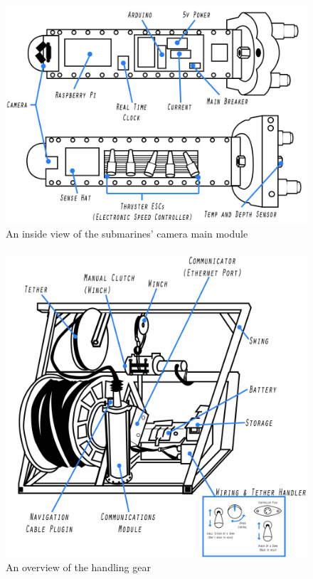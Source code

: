 \documentclass[
18pt, %
a4paper, %
oneside, %
headinclude,footinclude, %
]{scrartcl}
\begin{document}
\vspace*{5mm}
\begin{figure}[H]
	\centering 
	\hspace*{-2.5cm}
	\includegraphics[width=1.4\columnwidth]{Figures/Component_Diagrams/navigation_board.jpg}
	\caption[]{An inside view of the submarines' camera main module} %
\end{figure}
\vspace*{5mm}
\begin{figure}[H]
	\centering 
	\hspace*{-2.5cm}
	\includegraphics[width=1.4\columnwidth]{Figures/Component_Diagrams/handling_gear.jpg}
	\caption[]{An overview of the handling gear} %
\end{figure}
\end{document}
